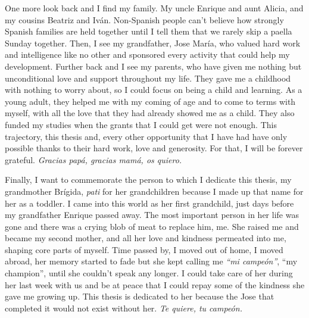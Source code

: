 One more look back and I find my family. My uncle Enrique and aunt Alicia, and my cousins Beatriz and Iván. Non-Spanish people can't believe how strongly Spanish families are held together until I tell them that we rarely skip a paella Sunday together. Then, I see my grandfather, Jose María, who valued hard work and intelligence like no other and sponsored every activity that could help my development. Further back and I see my parents, who have given me nothing but unconditional love and support throughout my life. They gave me a childhood with nothing to worry about, so I could focus on being a child and learning. As a young adult, they helped me with my coming of age and to come to terms with myself, with all the love that they had already showed me as a child. They also funded my studies when the grants that I could get were not enough. This trajectory, this thesis and, every other opportunity that I have had have only possible thanks to their hard work, love and generosity. For that, I will be forever grateful. \textit{Gracias papá, gracias mamá, os quiero.}

Finally, I want to commemorate the person to which I dedicate this thesis, my grandmother Brígida, \textit{pati} for her grandchildren because I made up that name for her as a toddler. I came into this world as her first grandchild, just days before my grandfather Enrique passed away. The most important person in her life was gone and there was a crying blob of meat to replace him, me. She raised me and became my second mother, and all her love and kindness permeated into me, shaping core parts of myself. Time passed by, I moved out of home, I moved abroad, her memory started to fade but she kept calling me \textit{``mi campeón''}, ``my champion'', until she couldn't speak any longer. I could take care of her during her last week with us and be at peace that I could repay some of the kindness she gave me growing up. This thesis is dedicated to her because the Jose that completed it would not exist without her. \textit{Te quiere, tu campeón.}